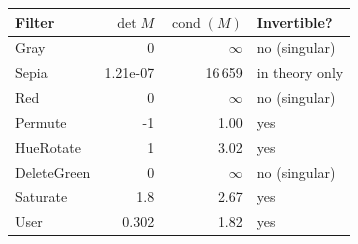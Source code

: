 \begin{tabular}{lrrl}
\toprule
Filter & $\det M$ & $\operatorname{cond}(M)$ & Invertible? \\
\midrule
Gray & 0 & $\infty$ & no (singular) \\
Sepia & 1.21e-07 & 16\,659 & in theory only \\
Red & 0 & $\infty$ & no (singular) \\
Permute & -1 & 1.00 & yes \\
HueRotate & 1 & 3.02 & yes \\
DeleteGreen & 0 & $\infty$ & no (singular) \\
Saturate & 1.8 & 2.67 & yes \\
User & 0.302 & 1.82 & yes \\
\bottomrule
\end{tabular}
